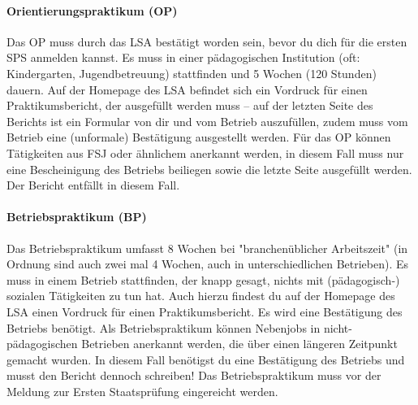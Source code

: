 \paragraph{Orientierungspraktikum (OP)}
Das OP muss durch das LSA bestätigt worden sein, bevor du dich für die ersten SPS anmelden kannst. Es muss in einer pädagogischen Institution (oft: Kindergarten, Jugendbetreuung) stattfinden und 5 Wochen (120 Stunden) dauern. Auf der Homepage des LSA befindet sich ein Vordruck für einen Praktikumsbericht, der ausgefüllt werden muss – auf der letzten Seite des Berichts ist ein Formular von dir und vom Betrieb auszufüllen, zudem muss vom Betrieb eine (unformale) Bestätigung ausgestellt werden.
Für das OP können Tätigkeiten aus FSJ oder ähnlichem anerkannt werden, in diesem Fall muss nur eine Bescheinigung des Betriebs beiliegen sowie die letzte Seite ausgefüllt werden. Der Bericht entfällt in diesem Fall.

\paragraph{Betriebspraktikum (BP)}
Das Betriebspraktikum umfasst 8 Wochen bei "branchenüblicher Arbeitszeit" (in Ordnung sind auch zwei mal 4 Wochen, auch in unterschiedlichen Betrieben). Es muss in einem Betrieb stattfinden, der knapp gesagt, nichts mit (pädagogisch-) sozialen Tätigkeiten zu tun hat. Auch hierzu findest du auf der Homepage des LSA einen Vordruck für einen Praktikumsbericht. Es wird eine Bestätigung des Betriebs benötigt.
Als Betriebspraktikum können Nebenjobs in nicht-pädagogischen Betrieben anerkannt werden, die über einen längeren Zeitpunkt gemacht wurden. In diesem Fall benötigst du eine Bestätigung des Betriebs und musst den Bericht dennoch schreiben!
Das Betriebspraktikum muss vor der Meldung zur Ersten Staatsprüfung eingereicht werden.
\spaltenende
